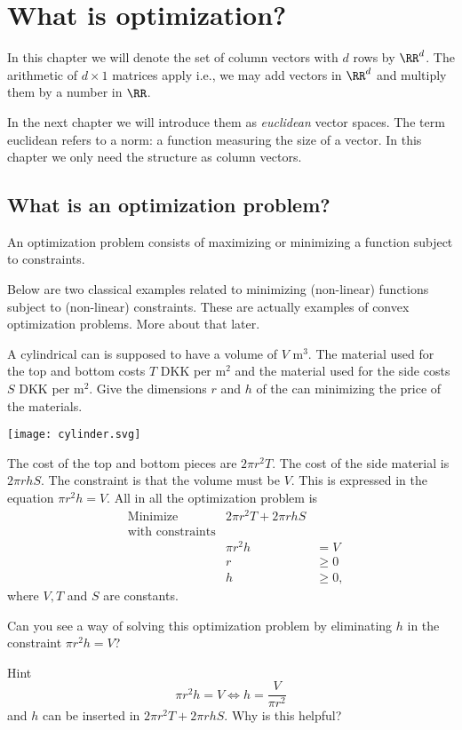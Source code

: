 \documentclass{article}
\begin{document}
\chapter{What is optimization?}\label{whatisopt}


In this chapter we will denote the set of column vectors with $d$ rows by $\RR^d$.
The arithmetic
of $d\times 1$ matrices apply i.e., we may add vectors in $\RR^d$ and
multiply them by a number in $\RR$.

In the next chapter we will introduce them as \emph{euclidean} vector spaces. The
term euclidean refers to a norm: a function measuring the size of a vector. In this
chapter we only need the structure as column vectors.


\section{What is an optimization problem?}

An optimization problem consists of maximizing or minimizing a function subject
to constraints.

Below are two classical examples related to minimizing (non-linear) functions subject to
(non-linear) constraints. These are actually examples of
convex optimization problems. More about that later.

\begin{example}

  A cylindrical can is supposed to have a volume of $V$ $\text{m}^3$. The material used
  for the top and bottom costs $T$ DKK per $\text{m}^2$ and the material used for
  the side costs $S$ DKK per $\text{m}^2$. Give the dimensions $r$ and $h$ of the
  can minimizing the price of the materials.
  
\texttt{[image: cylinder.svg]}

The cost of the top and bottom pieces are $2 \pi r^2 T$. The cost of the
side material is $2\pi r h S$. The constraint is that the volume must be
$V$. This is expressed in the equation $\pi r^2 h = V$. All in all
the optimization problem is
\begin{align*}
  &\text{Minimize} &2\pi r^2 T + 2\pi r h S&\\
  &\text{with constraints}\\
  &&\pi r^2 h &= V\\
  &&r &\geq 0\\
  &&h &\geq 0,
\end{align*}
where $V, T$ and $S$ are constants.

\beginshex
Can you see a way of solving this optimization problem by eliminating $h$ in
the constraint $\pi r^2 h = V$?

\begin{hideinbutton}{Hint}
$$
\pi r^2 h = V\iff h = \frac{V}{\pi r^2}
$$
and $h$ can be inserted in $2\pi r^2 T + 2 \pi r h S$. Why is this helpful?
\end{hideinbutton}
\endshex
\end{example}
\end{document}
